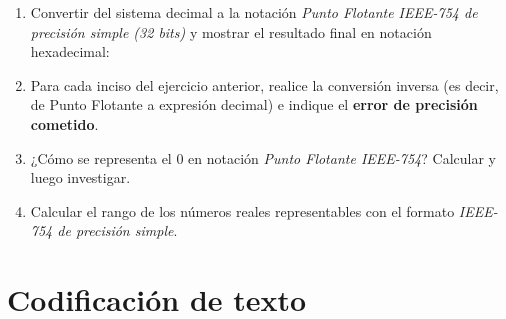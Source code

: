 \documentclass[12pt]{article}
\begin{document}
\begin{enumerate}

    \item Convertir del sistema decimal a la notación \emph{Punto Flotante
        IEEE-754 de precisión simple (32 bits)} y mostrar el resultado final
        en notación hexadecimal:


    \item Para cada inciso del ejercicio anterior, realice la conversión
        inversa (es decir, de Punto Flotante a expresión decimal) e indique el
        \textbf{error de precisión cometido}.

    \item ¿Cómo se representa el 0 en notación \emph{Punto Flotante IEEE-754}?
        Calcular y luego investigar.

    \item Calcular el rango de los números reales representables con el
        formato \emph{IEEE-754 de precisión simple}.

\end{enumerate}

\section{Codificación de texto}
\end{document}
